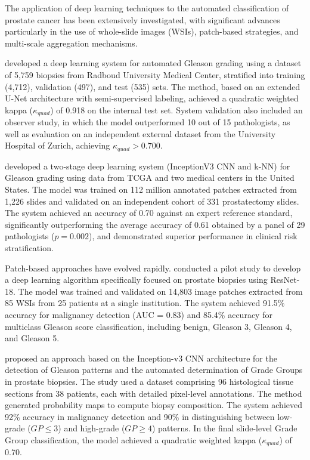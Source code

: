 The application of deep learning techniques to the automated classification of prostate cancer has been extensively investigated, with significant advances particularly in the use of whole-slide images (WSIs), patch-based strategies, and multi-scale aggregation mechanisms.

\cite{ref-bulten2020} developed a deep learning system for automated Gleason grading using a dataset of 5,759 biopsies from Radboud University Medical Center, stratified into training (4,712), validation (497), and test (535) sets. The method, based on an extended U-Net architecture with semi-supervised labeling, achieved a quadratic weighted kappa ($\kappa_{quad}$) of 0.918 on the internal test set. System validation also included an observer study, in which the model outperformed 10 out of 15 pathologists, as well as evaluation on an independent external dataset from the University Hospital of Zurich, achieving $\kappa_{quad} > 0.700$.

\cite{ref-nagpal2019} developed a two-stage deep learning system (InceptionV3 CNN and k-NN) for Gleason grading using data from TCGA and two medical centers in the United States. The model was trained on 112 million annotated patches extracted from 1,226 slides and validated on an independent cohort of 331 prostatectomy slides. The system achieved an accuracy of 0.70 against an expert reference standard, significantly outperforming the average accuracy of 0.61 obtained by a panel of 29 pathologists ($p = 0.002$), and demonstrated superior performance in clinical risk stratification.

Patch-based approaches have evolved rapidly.
\cite{ref-kott2019} conducted a pilot study to develop a deep learning algorithm specifically focused on prostate biopsies using ResNet-18. The model was trained and validated on 14,803 image patches extracted from 85 WSIs from 25 patients at a single institution. The system achieved 91.5\% accuracy for malignancy detection (AUC = 0.83) and 85.4\% accuracy for multiclass Gleason score classification, including benign, Gleason 3, Gleason 4, and Gleason 5.

\cite{ref-lucas2019} proposed an approach based on the Inception-v3 CNN architecture for the detection of Gleason patterns and the automated determination of Grade Groups in prostate biopsies. The study used a dataset comprising 96 histological tissue sections from 38 patients, each with detailed pixel-level annotations. The method generated probability maps to compute biopsy composition. The system achieved 92\% accuracy in malignancy detection and 90\% in distinguishing between low-grade ($GP \le 3$) and high-grade ($GP \ge 4$) patterns. In the final slide-level Grade Group classification, the model achieved a quadratic weighted kappa ($\kappa_{quad}$) of 0.70.

